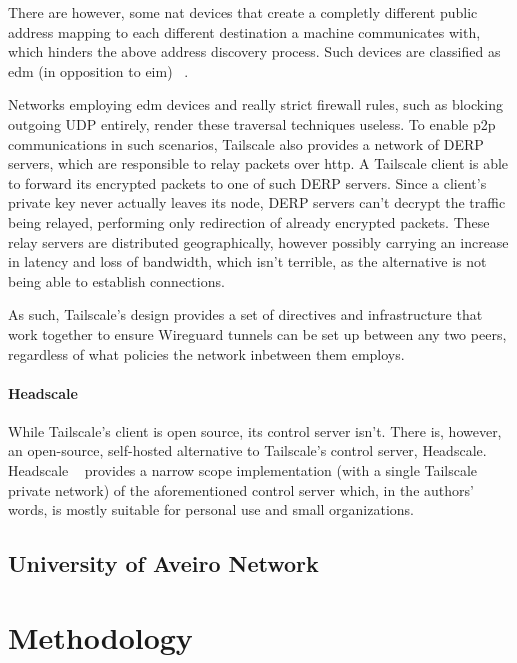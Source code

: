 \documentclass[11pt,twoside,a4paper]{report}
\begin{document}
There are however, some \acrshort{nat} devices that create a completly different public address mapping to each different destination a machine communicates with, which hinders the above address discovery process. Such devices are classified as \acrfull{edm} (in opposition to \acrfull{eim}) ~\cite{rfc4787}.

Networks employing \acrshort{edm} devices and really strict firewall rules, such as blocking outgoing UDP entirely, render these traversal techniques useless. To enable \acrshort{p2p} communications in such scenarios, Tailscale also provides a network of \acrfull{DERP} servers, which are responsible to relay packets over \acrshort{http}. A Tailscale client is able to forward its encrypted packets to one of such \acrshort{DERP} servers. Since a client's private key never actually leaves its node, \acrshort{DERP} servers can't decrypt the traffic being relayed, performing only redirection of already encrypted packets. These relay servers are distributed geographically, however possibly carrying an increase in latency and loss of bandwidth, which isn't terrible, as the alternative is not being able to establish connections.

As such, Tailscale's design provides a set of directives and infrastructure that work together to ensure Wireguard tunnels can be set up between any two peers, regardless of what policies the network inbetween them employs.

\subsubsection{Headscale}

While Tailscale's client is open source, its control server isn't. There is, however, an open-source, self-hosted alternative to Tailscale's control server, Headscale. Headscale ~\cite{headscale2023online} provides a narrow scope implementation (with a single Tailscale private network) of the aforementioned control server which, in the authors' words, is mostly suitable for personal use and small organizations.


\section{University of Aveiro Network}

\chapter{Methodology}
\label{chapter:method}
\end{document}
